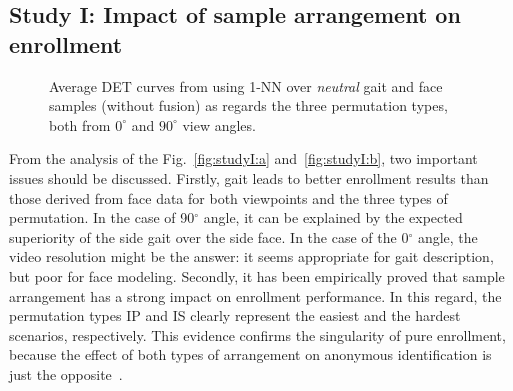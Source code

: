 \documentclass{llncs}
\begin{document}
\subsection{Study I: Impact of sample arrangement on enrollment}\label{subsec:studyI}

\vspace{-1mm}
\begin{figure}[t]
   \centering
   \caption{Average DET curves from using 1-NN over \emph{neutral} gait and face samples (without fusion) as regards the three permutation types, both from $0^{\circ}$ and $90^{\circ}$ view angles.}
   \label{fig:studyI}               
\end{figure}

From the analysis of the Fig.~\ref{fig:studyI:a} and~\ref{fig:studyI:b}, two important issues should be discussed. Firstly, gait leads to better enrollment results than those derived from face data for both viewpoints and the three types of permutation. In the case of 90$^{\circ}$ angle, it can be explained by the expected superiority of the side gait over the side face. In the case of the 0$^{\circ}$ angle, the video resolution might be the answer: it seems appropriate for gait description,  but poor for face modeling. Secondly, it has been empirically proved that sample arrangement has a strong impact on enrollment performance. In this regard, the permutation types IP and IS clearly represent the easiest and the hardest scenarios, respectively. This evidence confirms the singularity of pure enrollment, because the effect of both types of arrangement on anonymous identification is just the opposite~\cite{DeCann:2012}.  
\end{document}
